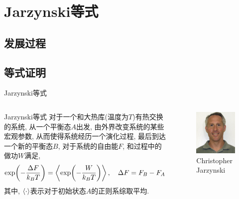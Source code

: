 \documentclass[aspectratio=169]{wzbeamer}
\begin{document}
\section{Jarzynski等式}
    \subsection{发展过程}
    \subsection{等式证明}
    \begin{frame}{Jarzynski等式}
        \begin{columns}
            \begin{alertblock}{Jarzynski等式}
                对于一个和大热库(温度为$T$)有热交换的系统, 从一个平衡态$A$出发, 由外界改变系统的某些宏观参数, 从而使得系统经历一个演化过程, 最后到达一个新的平衡态$B$, 对于系统的自由能$F$, 和过程中的做功$W$满足,
                \begin{equation}
                    \exp (- \frac{\Delta F}{k_B T}) = \expval{\exp (- \frac{W}{k_B T})},\quad \Delta F = F_B - F_A
                \end{equation}
                其中, $\expval{\cdot}$表示对于初始状态$A$的正则系综取平均.
            \end{alertblock}
            \begin{figure}[H]
                \centering
                \includegraphics[width=.9\textwidth]{jarz.jpg}
                \caption{Christopher Jarzynski}
            \end{figure}
        \end{columns}
    \end{frame}
\end{document}
